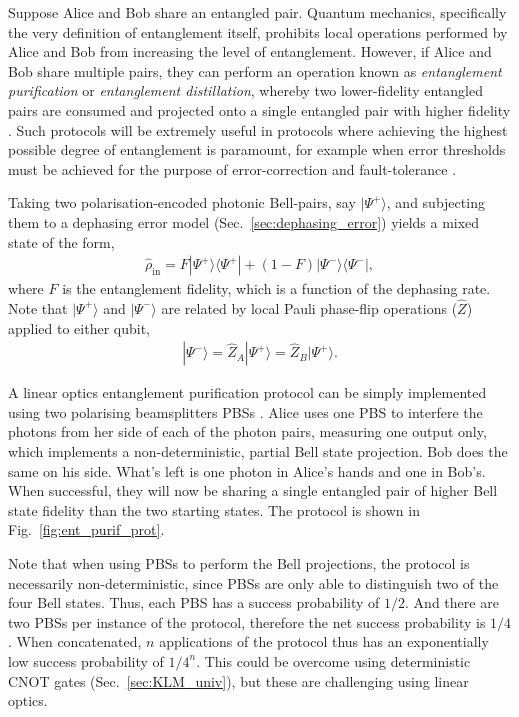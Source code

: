\documentclass[aps, rmp, twocolumn, amsmath, amssymb, nofootinbib, superscriptaddress, longbibliography, floatfix, table-of-contents, eqsecnum]{revtex4-1}
\newcommand{\bra}[1]{\langle#1|}
\newcommand{\ket}[1]{|#1\rangle}
\begin{document}
Suppose Alice and Bob share an entangled pair. Quantum mechanics, specifically the very definition of entanglement itself, prohibits local operations performed by Alice and Bob from increasing the level of entanglement. However, if Alice and Bob share multiple pairs, they can perform an operation known as \textit{entanglement purification} or \textit{entanglement distillation}, whereby two lower-fidelity entangled pairs are consumed and projected onto a single entangled pair with higher fidelity \cite{bib:PRA_53_2046, bib:PRA_54_3824, bib:PRL_77_2818}. Such protocols will be extremely useful in protocols where achieving the highest possible degree of entanglement is paramount, for example when error thresholds must be achieved for the purpose of error-correction and fault-tolerance \cite{bib:NielsenChuang00}.

Taking two polarisation-encoded photonic Bell-pairs, say $\ket{\Psi^+}$, and subjecting them to a dephasing error model (Sec.~\ref{sec:dephasing_error}) yields a mixed state of the form,
\begin{align}
\hat\rho_\text{in} = F\ket{\Psi^+}\bra{\Psi^+} + (1-F)\ket{\Psi^-}\bra{\Psi^-},
\end{align}
where $F$ is the entanglement fidelity, which is a function of the dephasing rate. Note that $\ket{\Psi^+}$ and $\ket{\Psi^-}$ are related by local Pauli phase-flip operations ($\hat{Z}$) applied to either qubit,
\begin{align} \label{eq:psi_minus}
\ket{\Psi^-} = \hat{Z}_A \ket{\Psi^+} = \hat{Z}_B \ket{\Psi^+}.
\end{align}

A linear optics entanglement purification protocol can be simply implemented using two polarising beamsplitters PBSs \cite{bib:Pan01, bib:Pan03}. Alice uses one PBS to interfere the photons from her side of each of the photon pairs, measuring one output only, which implements a non-deterministic, partial Bell state projection. Bob does the same on his side. What's left is one photon in Alice's hands and one in Bob's. When successful, they will now be sharing a single entangled pair of higher Bell state fidelity than the two starting states. The protocol is shown in Fig.~\ref{fig:ent_purif_prot}.

Note that when using PBSs to perform the Bell projections, the protocol is necessarily non-deterministic, since PBSs are only able to distinguish two of the four Bell states. Thus, each PBS has a success probability of $1/2$. And there are two PBSs per instance of the protocol, therefore the net success probability is $1/4$. When concatenated, $n$ applications of the protocol thus has an exponentially low success probability of $1/4^n$. This could be overcome using deterministic CNOT gates (Sec.~\ref{sec:KLM_univ}), but these are challenging using linear optics.
\end{document}
